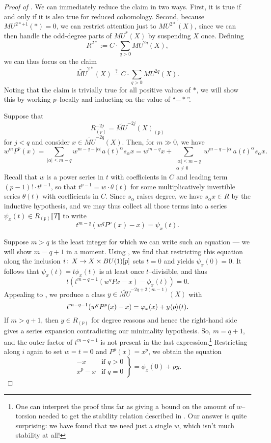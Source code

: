 \begin{proof}[{Proof of }]
We can immediately reduce the claim in two ways.  First, it is true if and only if it is also true for reduced cohomology.  Second, because $MU^{2*+1}(*) = 0$, we can restrict attention just to $MU^{2*}(X)$, since we can then handle the odd-degree parts of $MU^*(X)$ by suspending $X$ once.  Defining \[R^{2*} := C \cdot \sum_{q > 0} MU^{2q}(X),\] we can thus focus on the claim \[\widetilde{MU}^{2*}(X) \stackrel{?}{=} C \cdot \sum_{q > 0} MU^{2q}(X).\]  Noting that the claim is trivially true for all positive values of $*$, we will show this by working $p$--locally and inducting on the value of ``$-*$''.

Suppose that \[R^{-2j}_{(p)} = \widetilde{MU}^{-2j}(X)_{(p)}\] for $j < q$ and consider $x \in \widetilde{MU}^{-2q}(X)$.  Then, for $m \gg 0$, we have \[w^m P^p(x) = \sum_{|\alpha| \le m-q} w^{m-q - |\alpha|} a(t)^\alpha s_\alpha x = w^{m-q} x + \sum_{\substack{|\alpha| \le m-q \\ \alpha \ne 0}} w^{m-q - |\alpha|} a(t)^\alpha s_\alpha x.\]  Recall that $w$ is a power series in $t$ with coefficients in $C$ and leading term $(p-1)! \cdot t^{p-1}$, so that $t^{p-1} = w \cdot \theta(t)$ for some multiplicatively invertible series $\theta(t)$ with coefficients in $C$.  Since $s_\alpha$ raises degree, we have $s_\alpha x \in R$ by the inductive hypothesis, and we may thus collect all those terms into a series $\psi_x(t) \in R_{(p)}\llbracket T \rrbracket$ to write \[t^{m-q}(w^qP^p(x) - x) = \psi_x(t).\]

Suppose $m > q$ is the least integer for which we can write such an equation --- we will show $m = q+1$ in a moment.  Using , we find that restricting this equation along the inclusion $i\colon\thinspace X \to X \times BU(1)[p]$ sets $t = 0$ and yields $\psi_x(0) = 0$.  It follows that $\psi_x(t) = t \phi_x(t)$ is at least once $t$--divisible, and thus \[t (t^{m-q-1}(w^qPx - x) - \phi_x(t)) = 0.\]  Appealing to , we produce a class $y \in \widetilde{MU}^{-2q + 2(m-1)}(X)$ with \[t^{m-q-1}(w^q P^p(x) - x) = \varphi_x(x) + y \langle p\rangle(t).\]  If $m > q + 1$, then $y \in R_{(p)}$ for degree reasons and hence the right-hand side gives a series expansion contradicting our minimality hypothesis.  So, $m = q + 1$, and the outer factor of $t^{m-q-1}$ is not present in the last expression.\footnote{One can interpret the proof thus far as giving a bound on the amount of $w$--torsion needed to get the stability relation described in .  Our answer is quite surprising: we have found that we need just a single $w$, which isn't much stability at all!}  Restricting along $i$ again to set $w = t = 0$ and $P^p(x) = x^p$, we obtain the equation \[\left. \begin{array}{rr} -x & \text{if $q > 0$} \\ x^p - x & \text{if $q = 0$} \end{array} \right\} = \phi_x(0) + py.\]


\end{proof}
